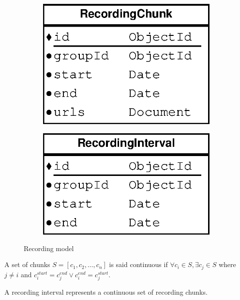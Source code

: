 \begin{figure}[H]
    \centering
    \begin{subfigure}[b]{0.3\textwidth}
    	\includegraphics[width=\textwidth]{figures/model_recording_chunk}
    \end{subfigure}
    \begin{subfigure}[b]{0.3\textwidth}
    	\includegraphics[width=\textwidth]{figures/model_recording_interval}
    \end{subfigure}
    \caption{Recording model}
\end{figure} 

A set of chunks $S=[c_1,c_2,\ldots,c_n]$ is said continuous if $\forall c_i\in S, \exists c_j \in S$ where $j\neq i$ and $c_i^{start} = c_j^{end} \vee c_i^{end} = c_j^{start}$. 

A recording interval represents a continuous set of recording chunks.